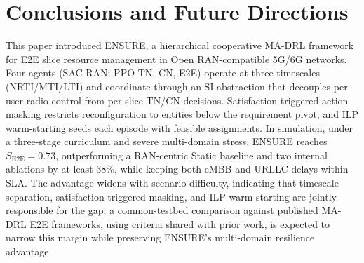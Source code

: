 \documentclass[12pt,lettersize,journal,onecolumn]{IEEEtran}
\begin{document}
\section{Conclusions and Future Directions} \label{conclusion-section}
This paper introduced ENSURE, a hierarchical cooperative MA-DRL framework for E2E slice resource management in Open RAN-compatible 5G/6G networks. Four agents (SAC RAN; PPO TN, CN, E2E) operate at three timescales (NRTI/MTI/LTI) and coordinate through an SI abstraction that decouples per-user radio control from per-slice TN/CN decisions. Satisfaction-triggered action masking restricts reconfiguration to entities below the requirement pivot, and ILP warm-starting seeds each episode with feasible assignments. In simulation, under a three-stage curriculum and severe multi-domain stress, ENSURE reaches $S_{\mathrm{E2E}}=0.73$, outperforming a RAN-centric Static baseline and two internal ablations by at least 38\%, while keeping both eMBB and URLLC delays within SLA. The advantage widens with scenario difficulty, indicating that timescale separation, satisfaction-triggered masking, and ILP warm-starting are jointly responsible for the gap; a common-testbed comparison against published MA-DRL E2E frameworks, using criteria shared with prior work, is expected to narrow this margin while preserving ENSURE's multi-domain resilience advantage.
\end{document}
